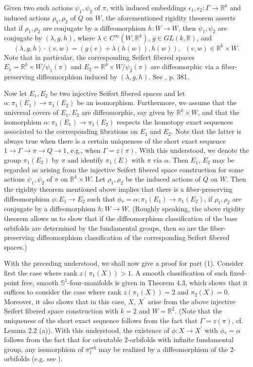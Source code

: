 \documentclass[11pt]{amsart}
\theoremstyle{plain}
\numberwithin{theorem}{section}
\theoremstyle{definition}
\begin{document}
Given two such actions $\psi_1,\psi_2$ of $\pi$, with induced embeddings $\epsilon_1, \epsilon_2:
\Gamma\rightarrow {{\mathbb R}}^k$ and induced actions $\rho_1,\rho_2$ of $Q$ on $W$, the aforementioned 
rigidity theorem asserts that if $\rho_1,\rho_2$ are conjugate by a diffeomorphism $h:W\rightarrow W$,
then $\psi_1,\psi_2$ are conjugate by $(\lambda,g,h)$, where $\lambda\in C^\infty (W,{{\mathbb R}}^k)$,
$g\in GL(k,{{\mathbb R}})$, and 
$$
(\lambda, g,h)\cdot (v,w)=(g(v)+\lambda(h(w)),h(w)), \;\;(v,w)\in {{\mathbb R}}^k\times W.
$$
Note that in particular, the corresponding Seifert fibered spaces 
$E_1={{\mathbb R}}^k\times W/\psi_1(\pi)$ and $E_2={{\mathbb R}}^k\times W/\psi_2(\pi)$ are diffeomorphic via 
a fiber-preserving diffeomorphism induced by $(\lambda,g,h)$. See \cite{LR0}, p. 381.

Now let $E_1,E_2$ be two injective Seifert fibered spaces and let $\alpha: \pi_1(E_1)
\rightarrow \pi_1(E_2)$ be an isomorphism. Furthermore, we assume that the universal 
covers of $E_1,E_2$ are diffeomorphic, say given by ${{\mathbb R}}^k\times W$, and that the isomorphism
$\alpha: \pi_1(E_1)\rightarrow \pi_1(E_2)$ respects the homotopy exact sequences associated 
to the corresponding fibrations on $E_1$ and $E_2$. Note that the latter is always true when 
there is a certain uniqueness of the short exact sequence 
$1\rightarrow \Gamma\rightarrow \pi\rightarrow Q\rightarrow 1$, e.g.,  when $\Gamma=z(\pi)$.
With this understood, we denote the group $\pi_1(E_2)$ by $\pi$ and identify $\pi_1(E)$ with 
$\pi$ via $\alpha$. Then $E_1$, $E_2$ may be regarded as arising from the injective Seifert 
fibered space construction for some actions $\psi_1,\psi_2$ of $\pi$ on ${{\mathbb R}}^k\times W$. 
Let $\rho_1,\rho_2$ be the induced actions of $Q$ on $W$. Then the rigidity theorem mentioned above implies that there is a fiber-preserving diffeomorphism $\phi: E_1\rightarrow E_2$ such
that $\phi_\ast=\alpha: \pi_1(E_1)\rightarrow \pi_1(E_2)$, if $\rho_1,\rho_2$ are conjugate by a diffeomorphism $h:W\rightarrow W$. (Roughly speaking, the above rigidity theorem allows us to 
show that if the diffeomorphism classification of the base orbifolds are determined by
the fundamental groups, then so are the fiber-preserving diffeomorphism classification of the 
corresponding Seifert fibered spaces.)

With the preceding understood, we shall now give a proof for part (1).  Consider first the case
where $\text{rank }z(\pi_1(X))>1$. A smooth classification of such fixed-point free, smooth 
${{\mathbb S}}^1$-four-manifolds is given in Theorem 4.3, which shows that it suffices to consider the case 
where $\text{rank }z(\pi_1(X))=2$ and $\pi_2(X)=0$. Moreover, it also shows that in this case, 
$X$, $X^\prime$ arise from the above injective Seifert fibered space construction with 
$k=2$ and $W={{\mathbb R}}^2$. (Note that the uniqueness of the short exact sequence follows from 
the fact that $\Gamma=z(\pi)$, cf. Lemma 2.2 (a)). With this understood, the existence of 
$\phi:X\rightarrow X^\prime$ with $\phi_\ast=\alpha$ follows from the fact that for orientable 
$2$-orbifolds with infinite fundamental group,  any isomorphism 
of $\pi_1^{orb}$ may be realized by a diffeomorphism of the $2$-orbifolds (e.g. see \cite{Mac}).
\end{document}
